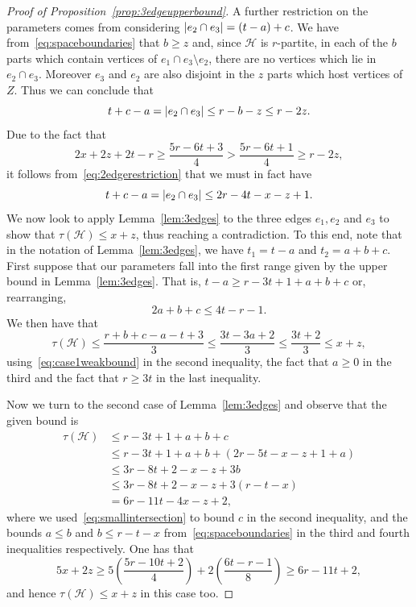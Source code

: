 \documentclass[a4paper,twoside,11pt]{article}
\DeclarePairedDelimiter{\card}{|}{|}
\numberwithin{thm}{section}
\theoremstyle{definition}
\theoremstyle{remark}
\theoremstyle{definition}
\def\cH{{\mathcal H}}
\begin{document}
\begin{proof}[Proof of Proposition~\ref{prop:3edgeupperbound}]
A further restriction on the parameters comes from considering $\card{e_2\cap e_3}=(t-a)+c$. We have from~\eqref{eq:spaceboundaries} that $b \geq z$ and, since $\cH$ is $r$-partite, in each of the $b$ parts which contain vertices of $e_1 \cap e_3 \setminus e_2$, there are no vertices which lie in $e_2 \cap e_3$. Moreover $e_3$ and $e_2$ are also disjoint in the $z$ parts which host vertices of $Z$. Thus we can conclude that 
\[t+c-a= \card{e_2\cap e_3} \leq r-b-z \leq r-2z. \]
Due to the fact that
\begin{equation} \label{eq:nobigintersection}
2x+2z+2t-r\geq \frac{5r-6t+3}{4} > \frac{5r-6t+1}{4}\geq r-2z,
\end{equation}
it follows from~\eqref{eq:2edgerestriction} that we must in fact have
\begin{equation} \label{eq:smallintersection}
    t+c-a= \card{e_2\cap e_3} \leq 2r-4t-x-z+1.
\end{equation}
We now look to apply Lemma~\ref{lem:3edges} to the three edges $e_1,e_2$ and $e_3$ to show that $\tau(\cH) \leq x +z$, thus reaching a contradiction. To this end, note that in the notation of Lemma~\ref{lem:3edges}, we have $t_1=t-a$ and $t_2=a+b+c$. First suppose that our parameters fall into the first range given by the upper bound in Lemma~\ref{lem:3edges}. That is, $t-a \geq r-3t+1+a+b+c$ or, rearranging, 
\begin{equation} \label{eq:case1weakbound}
    2a+b+c \leq 4t-r-1.
\end{equation}
We then have that 
\begin{equation}
    \label{eq:case1bound}\tau(\cH) \leq \frac{r+b+c-a-t+3}{3} \leq \frac{3t-3a+2}{3}\leq \frac{3t+2}{3}\leq x+z,  \end{equation}
using~\eqref{eq:case1weakbound} in the second inequality, the fact that $a\geq 0$ in the third and the fact that $r\geq 3t$ in the last inequality.  

Now we turn to the second case of Lemma~\ref{lem:3edges} and observe that the given bound  is \begin{align*}
     \tau(\cH)&\leq r-3t+1+a+b+c \\ &\leq r-3t+1 +a +b + (2r-5t-x-z+1+a) \\ &\leq 3r-8t+2-x-z+3b  \\ &\leq 3r-8t+2-x-z+3(r-t-x)\\ &=6r-11t-4x-z+2, 
     \end{align*}
where we used~\eqref{eq:smallintersection} to bound $c$ in the second inequality, and the bounds $a \le b$ and $b \le r - t - x$ from~\eqref{eq:spaceboundaries} in the third and fourth inequalities respectively. One has that 
\begin{equation} \label{eq:case2bound}
    5x+2z\geq 5\left(\frac{5r-10t + 2}{4}\right)+2 \left(\frac{6t-r-1}{8}\right)\geq 6r-11t+2,
\end{equation}
and hence $\tau(\cH)\leq x+z$ in this case too.


\end{proof}
\end{document}
